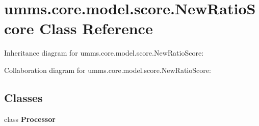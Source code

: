\hypertarget{classumms_1_1core_1_1model_1_1score_1_1_new_ratio_score}{\section{umms.\+core.\+model.\+score.\+New\+Ratio\+Score Class Reference}
\label{classumms_1_1core_1_1model_1_1score_1_1_new_ratio_score}
}


Inheritance diagram for umms.\+core.\+model.\+score.\+New\+Ratio\+Score\+:


Collaboration diagram for umms.\+core.\+model.\+score.\+New\+Ratio\+Score\+:
\subsection*{Classes}
\begin{DoxyCompactItemize}
\item 
class {\bfseries Processor}
\end{DoxyCompactItemize}
